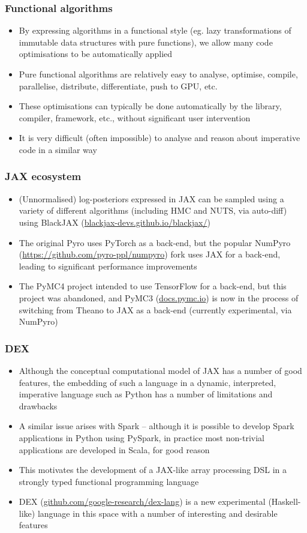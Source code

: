 \documentclass[mathserif,handout]{beamer}
\begin{document}
\begin{frame}
  \frametitle{Functional algorithms}
  \begin{itemize}
  \item By expressing algorithms in a functional style (eg. lazy transformations of immutable data structures with pure functions), we allow many code optimisations to be automatically applied
  \item \alert{Pure functional} algorithms are relatively easy to \alert{analyse}, \alert{optimise}, \alert{compile}, \alert{parallelise}, \alert{distribute}, \alert{differentiate}, push to GPU, etc.
  \item These optimisations can typically be done \alert{automatically} by the library, compiler, framework, etc., without significant user intervention
    \item It is very difficult (often impossible) to analyse and reason about imperative code in a similar way
  \end{itemize}
\end{frame}


\begin{frame}
  \frametitle{JAX ecosystem}
  \begin{itemize}
  \item (Unnormalised) log-posteriors expressed in JAX can be sampled using a variety of different algorithms (including HMC and NUTS, via auto-diff) using \alert{BlackJAX} (\url{blackjax-devs.github.io/blackjax/})
  \item The original Pyro uses PyTorch as a back-end, but the popular \alert{NumPyro} (\url{https://github.com/pyro-ppl/numpyro}) fork uses JAX for a back-end, leading to significant performance improvements
  \item The PyMC4 project intended to use TensorFlow for a back-end, but this project was abandoned, and \alert{PyMC3} (\url{docs.pymc.io}) is now in the process of switching from Theano to JAX as a back-end (currently experimental, via NumPyro)
  \end{itemize}
\end{frame}


\begin{frame}
  \frametitle{DEX}
  \begin{itemize}
  \item Although the conceptual computational model of JAX has a number of good features, the embedding of such a language in a dynamic, interpreted, imperative language such as Python has a number of limitations and drawbacks
  \item A similar issue arises with Spark -- although it is possible to develop Spark applications in Python using PySpark, in practice most non-trivial applications are developed in Scala, for good reason
  \item This motivates the development of a JAX-like array processing DSL in a strongly typed functional programming language
    \item \alert{DEX} (\url{github.com/google-research/dex-lang}) is a new experimental (Haskell-like) language in this space with a number of interesting and desirable features
  \end{itemize}
\end{frame}
\end{document}
